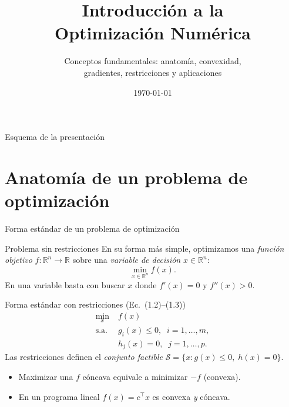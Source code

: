 \documentclass[10pt,aspectratio=169]{beamer}
\title{Introducción a la\\Optimización Numérica}
\subtitle{Conceptos fundamentales: anatomía, convexidad,\\
          gradientes, restricciones y aplicaciones}
\institute{Maestría en Matemática --- UNAH\\
           Universidad Nacional Autónoma de Honduras}
\date{\today}
\theoremstyle{definition}
\theoremstyle{plain}
\begin{document}

\begin{frame}
  \titlepage
\end{frame}

\begin{frame}{Esquema de la presentación}
  \tableofcontents
\end{frame}

\section{Anatomía de un problema de optimización}

\begin{frame}[t]{Forma estándar de un problema de optimización}
  \begin{block}{Problema sin restricciones}
    En su forma más simple, optimizamos una \emph{función objetivo}
    $f:\mathbb{R}^{n}\to\mathbb{R}$ sobre una \emph{variable de decisión}
    $x\in\mathbb{R}^{n}$:
    \[
      \min_{x\in\mathbb{R}^{n}} f(x).
    \]
    En una variable basta con buscar $x$ donde $f'(x)=0$ y $f''(x)>0$.
  \end{block}

  \vspace{0.15em}
  \begin{block}{Forma estándar con restricciones (Ec.~(1.2)--(1.3))}
    \begin{align*}
      \min_{x}\;     & f(x) \\
      \text{s.a. }   & g_{i}(x) \leq 0,\;\; i=1,\dots,m,\\
                     & h_{j}(x) = 0,\;\; j=1,\dots,p.
    \end{align*}
    Las restricciones definen el \emph{conjunto factible}
    $\mathcal{S}=\{x : g(x)\leq 0,\; h(x)=0\}$.
  \end{block}

  \vspace{0.2em}
  \begin{itemize}\setlength\itemsep{0pt}
    \item Maximizar una $f$ cóncava equivale a minimizar $-f$ (convexa).
    \item En un programa lineal $f(x)=c^{\top}x$ es convexa \emph{y} cóncava.
  \end{itemize}
\end{frame}
\end{document}
